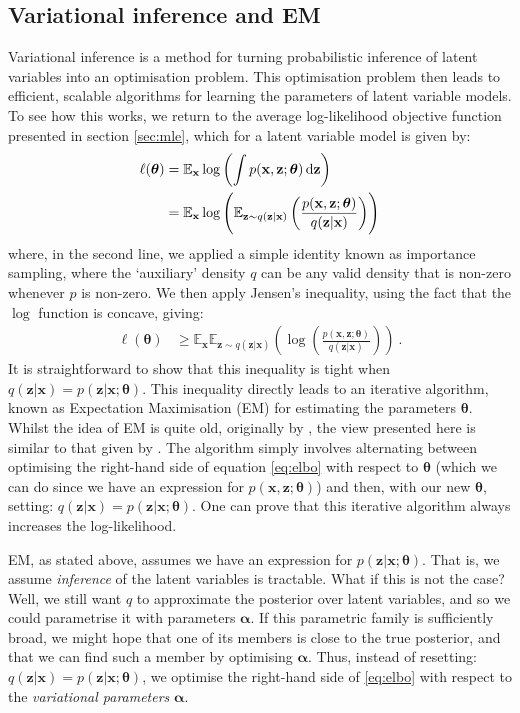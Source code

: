 \documentclass[11pt, oneside]{article}
\newcommand{\thetab}{{\boldsymbol{\theta}}}
\newcommand{\alphab}{{\boldsymbol{\alpha}}}
\newcommand{\pnorm}{p}
\newcommand{\q}[1]{q(\z|{#1})}
\newcommand{\x}{{\mathbf x}}
\newcommand{\z}{{\mathbf z}}
\newcommand{\E}{\mathbb{E}}
\newcommand{\Ex}{\E_{\x}}
\newcommand{\Evar}[1]{\E_{\z \sim \q{#1}}}
\theoremstyle{definition}
\begin{document}
\subsection{Variational inference and EM}
Variational inference is a method for turning probabilistic inference of latent variables into an optimisation problem. This optimisation problem then leads to efficient, scalable algorithms for learning the parameters of latent variable models. To see how this works, we return to the average log-likelihood objective function presented in section \ref{sec:mle}, which for a latent variable model is given by:
\begin{align}
    \ell(\thetab) &= \Ex  \log \left( \int \pnorm(\x, \z;\thetab) \dif \z  \right)  \\
                  &= \Ex \log \left( \Evar{\x} \left( \frac{\pnorm(\x, \z;\thetab)}{\q{\x}} \right)  \right)
\end{align}
where, in the second line, we applied a simple identity known as importance sampling, where the `auxiliary' density $q$ can be any valid density that is non-zero whenever $\pnorm$ is non-zero. We then apply Jensen's inequality, using the fact that the $\log$ function is concave, giving:
\begin{align}
    \ell(\thetab) &\geq \Ex \Evar{\x} \left( \log \left( \frac{\pnorm(\x, \z;\thetab)}{\q{\x}} \right) \right) \ .
    \label{eq:elbo}
\end{align}
It is straightforward to show that this inequality is tight when $\q{\x} = \pnorm(\z | \x; \thetab)$. This inequality directly leads to an iterative algorithm, known as Expectation Maximisation (EM) for estimating the parameters $\thetab$. Whilst the idea of EM is quite old, originally by \citet{dempster1977maximum}, the view presented here is similar to that given by \citet{neal1998view}. The algorithm simply involves alternating between optimising the right-hand side of equation \ref{eq:elbo} with respect to $\thetab$ (which we can do since we have an expression for $\pnorm(\x, \z;\thetab)$) and then, with our new $\thetab$, setting: $\q{\x} = \pnorm(\z | \x; \thetab)$. One can prove that this iterative algorithm always increases the log-likelihood.

EM, as stated above, assumes we have an expression for $\pnorm(\z | \x; \thetab)$. That is, we assume \emph{inference} of the latent variables is tractable. What if this is not the case? Well, we still want $q$ to approximate the posterior over latent variables, and so we could parametrise it with parameters $\alphab$. If this parametric family is sufficiently broad, we might hope that one of its members is close to the true posterior, and that we can find such a member by optimising $\alphab$. Thus, instead of resetting: $\q{\x} = \pnorm(\z | \x; \thetab)$, we optimise the right-hand side of \ref{eq:elbo} with respect to the \emph{variational parameters} $\alphab$.
\end{document}
